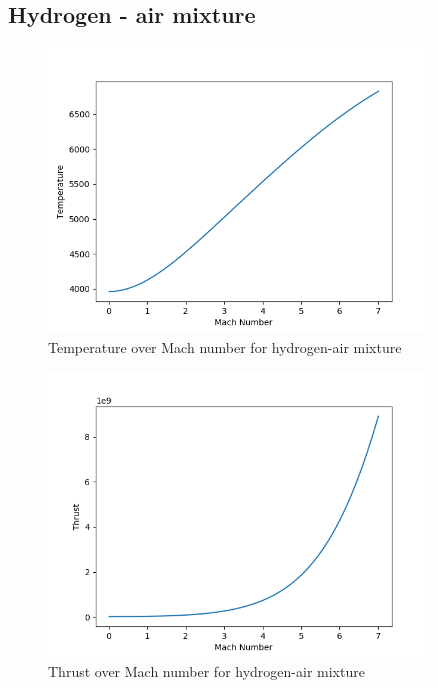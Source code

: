 \documentclass[a4paper,11pt]{article}
\begin{document}
\subsection{Hydrogen - air mixture}
	\begin{figure}[H]
		\centering
       		\includegraphics[width=0.9\textwidth]{H2_pow(1mol)/Temperature_over_Mach.png}
       		\caption{Temperature over Mach number for hydrogen-air mixture}
	\end{figure}
	\begin{figure}[H]
		\centering
		\includegraphics[width=0.9\textwidth]{H2_pow(1mol)/Thrust_over_Mach.png}
       		\caption{Thrust over Mach number for hydrogen-air mixture}
	\end{figure}
\end{document}

